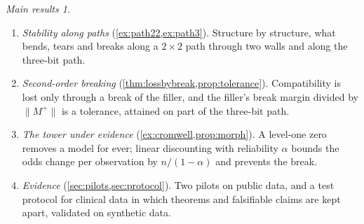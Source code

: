 \documentclass[11pt]{article}
\theoremstyle{definition}
\theoremstyle{remark}
\newtheorem*{mainthm}{Main results}
\begin{document}
\begin{mainthm}
\begin{enumerate}[label=(\Alph*),leftmargin=*]
  a polytope whose upper entropy is the sum of the margins' upper entropies; cones are compatible laws; breaking is created only by
  conditioning, Jeffrey updates with a zero target and kernels with a zero column, and removed by kernels with positive entries.
\item \emph{Stability along paths} (\cref{ex:path22,ex:path3}). Structure by structure, what bends, tears and breaks along a $2\times2$ path
  through two walls and along the three-bit path.
\item \emph{Second-order breaking} (\cref{thm:lossbybreak,prop:tolerance}). Compatibility is lost only through a break of the filler,
  and the filler's break margin divided by $\lVert M^+\rVert$ is a tolerance, attained on part of the three-bit path.
\item \emph{The tower under evidence} (\cref{ex:cromwell,prop:morph}). A level-one zero removes a model for ever; linear discounting with reliability $\alpha$
  bounds the odds change per observation by $n/(1-\alpha)$ and prevents the break.
\item \emph{Evidence} (\cref{sec:pilots,sec:protocol}). Two pilots on public data, and a test protocol for clinical
  data in which theorems and falsifiable claims are kept apart, validated on synthetic data.
\end{enumerate}
\end{mainthm}
\end{document}
